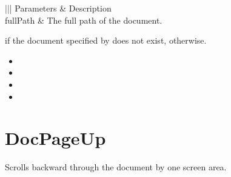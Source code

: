 \documentclass[letterpaper,12pt,english,openany,oneside]{sphinxmanual}
\begin{document}

\begin{sphinxVerbatim}[commandchars=\\\{\}]
\PYG{p}{[} \PYG{p}{]}
\end{sphinxVerbatim}
\label{\detokenize{IAC_API_DDE_Messages:parameters-9}}


\begin{savenotes}\sphinxattablestart
\centering
{}\label{\detokenize{IAC_API_DDE_Messages:section-9}}\nobreak
\begin{tabular}[t]{|||}
\hline
\sphinxstyletheadfamily 
Parameters
&\sphinxstyletheadfamily 
Description
\\
\hline
fullPath
&
The full path of the document.
\\
\hline
\end{tabular}
\par
\sphinxattableend\end{savenotes}


 if the document specified by  does not exist,  otherwise.

\label{\detokenize{IAC_API_DDE_Messages:related-methods-10}}
\begin{itemize}
\item {} 

\item {} 

\item {} 

\item {} 

\end{itemize}




\section{DocPageUp}
\label{\detokenize{IAC_API_DDE_Messages:id28}}
Scrolls backward through the document by one screen area.
\end{document}
